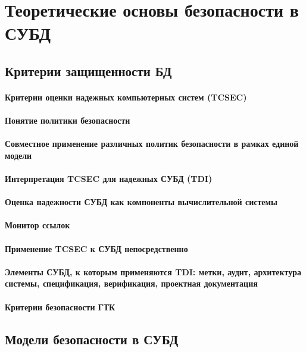 \section{Теоретические основы безопасности в СУБД}

\subsection{Критерии защищенности БД}

\paragraph{Критерии оценки надежных компьютерных систем (TCSEC)}
\paragraph{Понятие политики безопасности}
\paragraph{Совместное применение различных политик безопасности в рамках единой модели}
\paragraph{Интерпретация TCSEC для надежных СУБД (TDI)}
\paragraph{Оценка надежности СУБД как компоненты вычислительной системы}
\paragraph{Монитор ссылок}
\paragraph{Применение TCSEC к СУБД непосредственно}
\paragraph{Элементы СУБД, к которым применяются TDI: метки, аудит, архитектура системы, спецификация, верификация, проектная документация}
\paragraph{Критерии безопасности ГТК}

\subsection{Модели безопасности в СУБД}

